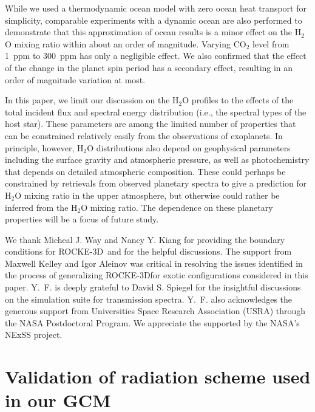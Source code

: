 \documentclass[11pt,numberedappendix,twocolappendix,]{emulateapj}
\def\water{H$_2$O }
\def\modelE{ROCKE-3D}
\begin{document}
While we used a thermodynamic ocean model with zero ocean heat transport for simplicity, comparable experiments with a dynamic ocean are also performed to demonstrate that this approximation of ocean results is a minor effect on the \water mixing ratio within about an order of magnitude. 
Varying CO$_2$ level from 1~ppm to 300~ppm has only a negligible effect. 
We also confirmed that the effect of the change in the planet spin period has a secondary effect, resulting in an order of magnitude variation at most. 


In this paper, we limit our discussion on the \water profiles to the effects of the total incident flux and spectral energy distribution (i.e., the spectral types of the host star). 
These parameters are among the limited number of properties that can be constrained relatively easily from the observations of exoplanets. 
In principle, however, \water distributions also depend on geophysical parameters including the surface gravity and atmospheric pressure, as well as photochemistry that depends on detailed atmospheric composition. 
These could perhaps be constrained by retrievals from observed planetary spectra to give a prediction for \water mixing ratio in the upper atmosphere, but  otherwise could rather be inferred from the \water mixing ratio. 
The dependence on these planetary properties will be a focus of future study. 





\acknowledgments
We thank Micheal J. Way and Nancy Y. Kiang for providing the boundary conditions for \modelE \ and for the helpful discussions. 
The support from Maxwell Kelley and Igor Aleinov was critical in resolving the issues identified in the process of generalizing \modelE for exotic configurations considered in this paper. 
Y.~F. is deeply grateful to David S. Spiegel for the insightful discussions on the simulation suite for transmission spectra. 
Y.~F. also acknowledges the generous support from Universities Space Research Association (USRA) through the NASA Postdoctoral Program. 
We appreciate the supported by the NASA's NExSS project. 




\appendix


\section{Validation of radiation scheme used in our GCM}
\label{ap:radiation}
\end{document}
